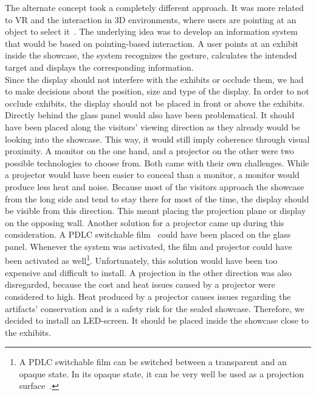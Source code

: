 The alternate concept took a completely different approach. It was more related to \ac{VR} and the interaction in \ac{3D} environments, where users are pointing at an object to select it~\cite{VRObjectSelectionCnG}. The underlying idea was to develop an information system that would be based on pointing-based interaction. A user points at an exhibit inside the showcase, the system recognizes the gesture, calculates the intended target and displays the corresponding information.
\\
Since the display should not interfere with the exhibits or occlude them, we had to make decisions about the position, size and type of the display. In order to not occlude exhibits, the display should not be placed in front or above the exhibits. Directly behind the glass panel would also have been problematical. It should have been placed along the visitors' viewing direction as they already would be looking into the showcase. This way, it would still imply coherence through visual proximity. A monitor on the one hand, and a projector on the other were two possible technologies to choose from. Both came with their own challenges. While a projector would have been easier to conceal than a monitor, a monitor would produce less heat and noise. Because most of the visitors approach the showcase from the long side and tend to stay there for most of the time, the display should be visible from this direction. This meant placing the projection plane or display on the opposing wall. Another solution for a projector came up during this consideration. A \ac{PDLC} switchable film~\cite{PDLC} could have been placed on the glass panel. Whenever the system was activated, the film and projector could have been activated as well\footnote{A \ac{PDLC} switchable film can be switched between a transparent and an opaque state. In its opaque state, it can be very well be used as a projection surface~\cite{PDLC}.}. Unfortunately, this solution would have been too expensive and difficult to install. A projection in the other direction was also disregarded, because the cost and heat issues caused by a projector were considered to high. Heat produced by a projector causes issues regarding the artifacts' conservation and is a safety risk for the sealed showcase. Therefore, we decided to install an LED-screen. It should be placed inside the showcase close to the exhibits.


